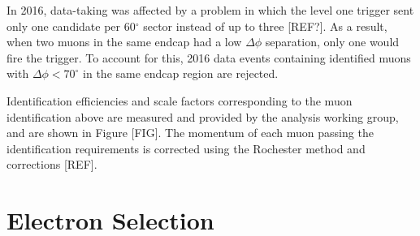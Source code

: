 In 2016, data-taking was affected by a problem in which the level one trigger sent only one candidate per 60$^{\circ}$ sector instead 
of up to three [REF?]. As a result, when two muons in the same endcap had a low $\Delta \phi$ separation, only one would fire the 
trigger. To account for this, 2016 data events containing identified muons with $\Delta \phi < 70^{\circ}$ in the same endcap region 
are rejected. 

Identification efficiencies and scale factors corresponding to the muon identification above are measured and provided by the 
\hzz analysis working group, and are shown in Figure [FIG]. The momentum of each muon passing the identification requirements is 
corrected using the Rochester method and corrections [REF]. 

\section{Electron Selection}

